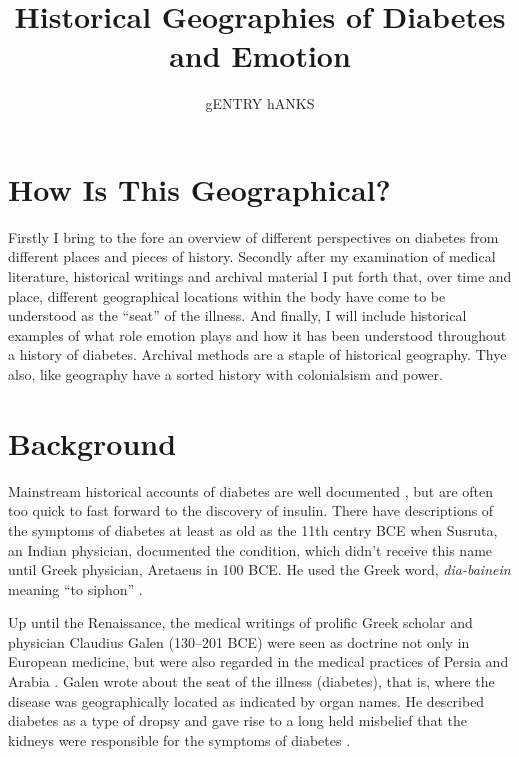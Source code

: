 \documentclass[12pt]{article}
\title{Historical Geographies of Diabetes and Emotion}
\author{gENTRY hANKS}
\begin{document}
\maketitle



\newpage
\section{How Is This Geographical?}
\doublespacing
Firstly I bring to the fore an overview of different perspectives on diabetes from different places and pieces of history. Secondly after my examination of medical literature, historical writings and archival material I put forth that, over time and place, different geographical locations within the body have come to be understood as the ``seat'' of the illness. And finally, I will include historical examples of what role emotion plays and how it has been understood throughout a history of diabetes. Archival methods are a staple of historical geography. Thye also, like geography have a sorted history with colonialsism and power. 

\section{Background}
\doublespacing
Mainstream historical accounts of diabetes are well documented \citep{engelhardt_diabetes_1989, tattersall_diabetes_2009}, but are often too quick to fast forward to the discovery of insulin. There have descriptions of the symptoms of diabetes at least as old as the 11th centry BCE when Susruta, an Indian physician, documented the condition, which didn't receive this name until Greek physician, Aretaeus in 100 BCE. He used the Greek word, \textit {dia-bainein} meaning ``to siphon'' \citep{sattley_history_1996}.  

Up until the Renaissance, the medical writings of prolific Greek scholar and physician Claudius Galen (130--201 BCE) were seen as doctrine not only in European medicine, but were also regarded in the medical practices of Persia and Arabia \citep{henschen_1969_term}. Galen wrote about the seat of the illness (diabetes), that is, where the disease was geographically located as indicated by organ names. He described diabetes as a type of dropsy and gave rise to a long held misbelief that the kidneys were responsible for the symptoms of diabetes \citep{henschen_1969_term}. 
\end{document}
